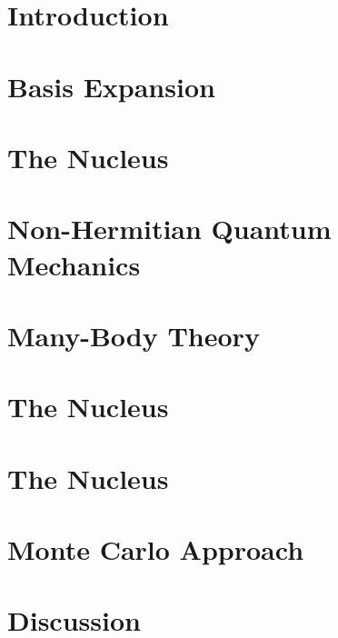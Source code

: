 \documentclass[12pt,a4paper]{report}
\begin{document}

\tableofcontents
\newpage

\setcounter{page}{1}

\chapter{Introduction}
\label{cha:introduction}



\chapter{Basis Expansion}
\label{cha:basis expansion}


\chapter{The  Nucleus}
\label{cha:he5}


\chapter{Non-Hermitian Quantum Mechanics} 
\label{cha:nhqm}


\chapter{Many-Body Theory}
\label{cha:many-body}



\chapter{The  Nucleus}
\label{cha:he6}


\chapter{The  Nucleus}
\label{cha:he7}

\chapter{Monte Carlo Approach}
\label{cha:monte carlo}


\chapter{Discussion}
\label{cha:disc}

\end{document}
